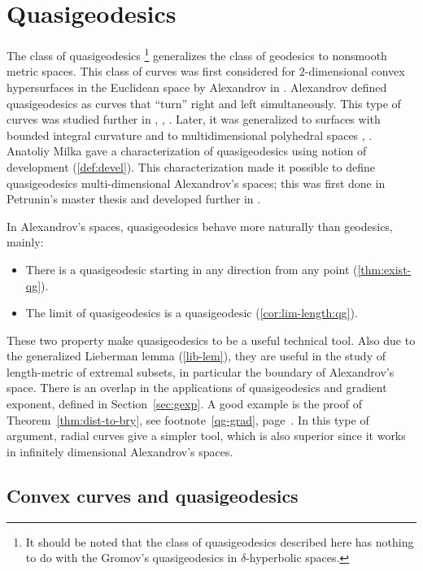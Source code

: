 \chapter{Quasigeodesics %
}\label{chap:qg}



The class of quasigeodesics%
\footnote{It should be noted that the class of quasigeodesics described here 
has nothing to do with the Gromov's quasigeodesics in $\delta$-hyperbolic spaces.} 
generalizes the class of geodesics to nonsmooth metric spaces.
This class of curves was first considered for $2$-dimensional convex hypersurfaces in the Euclidean space
by Alexandrov in \cite{alexandrov:qg}. 
Alexandrov defined quasigeodesics as curves that ``turn'' right and left simultaneously.
This type of curves was studied further in \cite{pogorelov:qg}, \cite{alexandrov-burago},
\cite{milka:qg}.
Later, it was generalized to surfaces with bounded integral
curvature \cite{alexandrov:int-qg} and to multidimensional polyhedral spaces \cite{milka:poly1},
\cite{milka:poly2}.
Anatoliy  Milka gave a characterization of quasigeodesics using notion of development (\ref{def:devel}).
This characterization made it possible to define quasigeodesics multi-dimensional Alexandrov's spaces;
this was first done in Petrunin's master thesis and developed further in \cite{perelman-petrunin:qg}.

In Alexandrov's spaces, quasigeodesics behave more naturally than geodesics, mainly: 
\begin{itemize}
\item There is a quasigeodesic starting in any direction from any point (\ref{thm:exist-qg}).
\item The limit of quasigeodesics is a quasigeodesic (\ref{cor:lim-length:qg}).
\end{itemize}

These two property make quasigeodesics to be a useful technical tool. 
Also due to the generalized Lieberman lemma (\ref{lib-lem}), 
they are useful in the study of length-metric of extremal subsets, 
in particular the boundary of Alexandrov's space. 
There is an overlap in the applications of quasigeodesics and gradient
exponent, defined in Section~\ref{sec:gexp}.
A good example is the proof of
Theorem~\ref{thm:dist-to-bry}, see footnote~\ref{qg-grad},
page~\pageref{qg-grad}.
In this type of argument, radial curves give a simpler tool,
which is also
superior since it works in infinitely dimensional Alexandrov's spaces.

\section{Convex curves and quasigeodesics}


